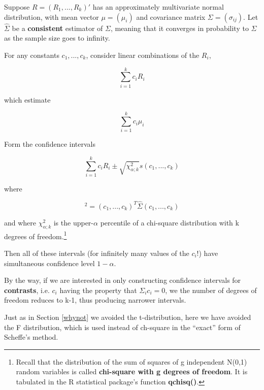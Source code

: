 \begin{theorem}

Suppose $R = (R_1,...,R_k)'$ has an approximately multivariate normal
distribution, with mean vector $\mu = (\mu_i)$ and covariance matrix
$\Sigma = (\sigma_{ij})$.  Let $\widehat{\Sigma}$ be a {\bf consistent}
estimator of $\Sigma$, meaning that it converges in probability to
$\Sigma$ as the sample size goes to infinity.

For any constants $c_1,...,c_k$, consider linear combinations of the
$R_i$, 

\begin{equation}
\label{lincomb}
\sum_{i=1}^{k} c_i R_i
\end{equation}

which estimate

\begin{equation}
\sum_{i=1}^{k} c_i \mu_i
\end{equation}

Form the confidence intervals 

\begin{equation}
\label{radius}
\sum_{i=1}^{k} c_i R_i \pm 
\sqrt{ \chi_{\alpha; k}^2} s(c_1,...,c_k)
\end{equation}

where

\begin{equation}
[s(c_1,...,c_k)]^2 = (c_1,...,c_k)^T \widehat{\Sigma} (c_1,...,c_k)
\end{equation}

and where $\chi_{\alpha; k}^2$ is the upper-$\alpha$ percentile of a
chi-square distribution with k degrees of freedom.\footnote{Recall
that the distribution of the sum of squares of g independent N(0,1)
random variables is called {\bf chi-square with g degrees of freedom}.
It is tabulated in the R statistical package's function {\bf qchisq()}.}

Then all of these intervals (for infinitely many values of the $c_i$!)
have simultaneous confidence level $1-\alpha$.

\end{theorem}

By the way, if we are interested in only constructing confidence
intervals for {\bf contrasts}, i.e. $c_i$ having the property that
$\Sigma_i c_i = 0$, we the number of degrees of freedom reduces to k-1,
thus producing narrower intervals.

Just as in Section \ref{whynot} we avoided the t-distribution, here we
have avoided the F distribution, which is used instead of ch-square in
the ``exact'' form of Scheffe's method.

